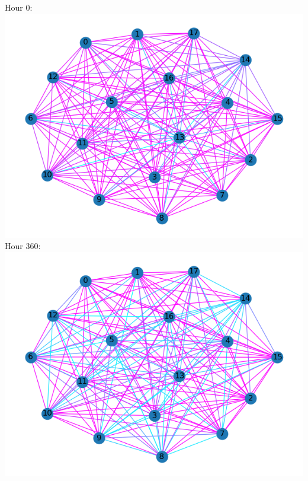\documentclass[11pt]{article}
\begin{document}
\begin{minipage}{0.3\textwidth}
Hour 0:\\
\includegraphics[scale=0.35]{../cor_images/p_800.png}\\
Hour 360:\\
\includegraphics[scale=0.35]{../cor_images/p_890.png}
\end{minipage}
\hfill
\end{document}
